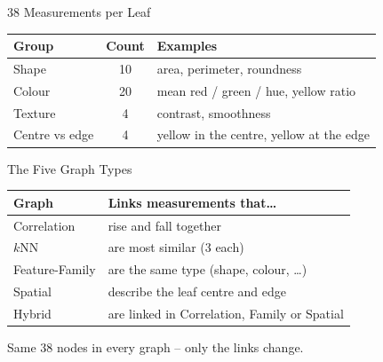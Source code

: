 \documentclass[aspectratio=169, 11pt]{beamer}
\begin{document}
\begin{frame}{38 Measurements per Leaf}
    \centering
    \small
    \renewcommand{\arraystretch}{1.4}
    \begin{tabular}{@{}l c l@{}}
        \toprule
        \textbf{Group} & \textbf{Count} & \textbf{Examples} \\
        \midrule
        Shape & 10 & area, perimeter, roundness \\
        Colour & 20 & mean red / green / hue, yellow ratio \\
        Texture \cite{haralick1973textural} & 4 & contrast, smoothness \\
        Centre vs edge & 4 & yellow in the centre, yellow at the edge \\
        \bottomrule
    \end{tabular}
    \vspace{0.5cm}

\end{frame}

\begin{frame}{The Five Graph Types}
    \centering
    \small
    \renewcommand{\arraystretch}{1.45}
    \begin{tabular}{@{}l l@{}}
        \toprule
        \textbf{Graph} & \textbf{Links measurements that\ldots} \\
        \midrule
        Correlation & rise and fall together \cite{pearson1895notes} \\
        $k$NN & are most similar (3 each) \cite{cover1967nearest} \\
        Feature-Family & are the same type (shape, colour, \ldots) \\
        Spatial & describe the leaf centre and edge \\
        Hybrid & are linked in Correlation, Family or Spatial \\
        \bottomrule
    \end{tabular}
    \vspace{0.4cm}

    {\footnotesize Same 38 nodes in every graph -- only the links change.}
\end{frame}
\end{document}
